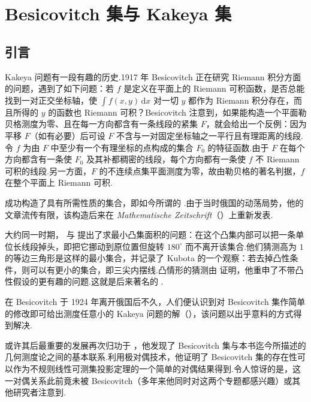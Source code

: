 
\chapter{Besicovitch 集与 Kakeya 集}\label{chap:7}

\section{引言}

Kakeya 问题有一段有趣的历史.1917 年 Besicovitch 正在研究 Riemann 积分方面的问题，遇到了如下问题：若 $f$ 是定义在平面上的 Riemann 可积函数，是否总能找到一对正交坐标轴，使 $\int f(x,y)\,\mathrm{d}x$ 对一切 $y$ 都作为 Riemann 积分存在，而且所得的 $y$ 的函数也 Riemann 可积？Besicovitch 注意到，如果能构造一个平面勒贝格测度为零、且在每一方向都含有一条线段的紧集 $F$，就会给出一个反例：因为平移 $F$（如有必要）后可设 $F$ 不含与一对固定坐标轴之一平行且有理距离的线段.令 $f$ 为由 $F$ 中至少有一个有理坐标的点构成的集合 $F_0$ 的特征函数.由于 $F$ 在每个方向都含有一条使 $F_0$ 及其补都稠密的线段，每个方向都有一条使 $f$ 不 Riemann 可积的线段.另一方面，$F$ 的不连续点集平面测度为零，故由勒贝格的著名判据，$f$ 在整个平面上 Riemann 可积.

\textcite{besicovitch1919} 成功构造了具有所需性质的集合，即如今所谓的 .由于当时俄国的动荡局势，他的文章流传有限，该构造后来在 \emph{Mathematische Zeitschrift}（\citeyear{besicovitch1928b}）上重新发表.

大约同一时期，\textcite{kakeya1917} 与 \textcite{fujiwarakakeya1917} 提出了求最小凸集面积的问题：在这个凸集内部可以把一条单位长线段掉头，即把它挪动到原位置但旋转 $180^{\circ}$ 而不离开该集合.他们猜测高为 $1$ 的等边三角形是这样的最小集合，并记录了 Kubota 的一个观察：若去掉凸性条件，则可以有更小的集合，即三尖内摆线.凸情形的猜测由 \textcite{pal1921} 证明，他重申了不带凸性假设的更有趣的问题.这就是后来著名的 .

在 Besicovitch 于 1924 年离开俄国后不久，人们便认识到对 Besicovitch 集作简单的修改即可给出测度任意小的 Kakeya 问题的解（\textcite{besicovitch1928b,perron1928}），该问题以出乎意料的方式得到解决.

或许其后最重要的发展再次归功于 \textcite{besicovitch1964a}，他发现了 Besicovitch 集与本书迄今所描述的几何测度论之间的基本联系.利用极对偶技术，他证明了 Besicovitch 集的存在性可以作为不规则线性可测集投影定理的一个简单的对偶结果得到.令人惊讶的是，这一对偶关系此前竟未被 Besicovitch（多年来他同时对这两个专题都感兴趣）或其他研究者注意到.

